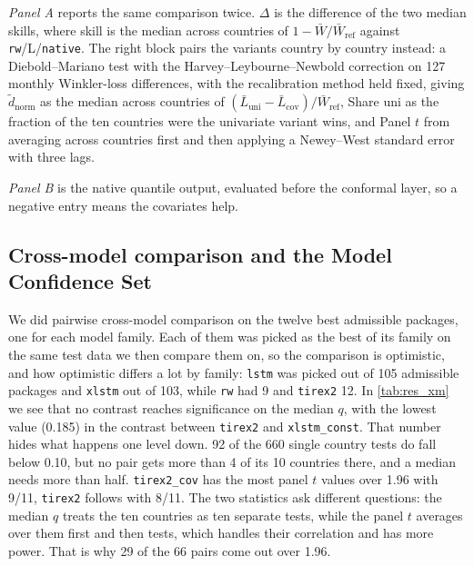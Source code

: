 \begin{table}[t]
{\begin{minipage}{0.98\textwidth}
\textit{Panel A} reports the same comparison twice. $\Delta$ is the difference of
the two median skills, where skill is the median across countries of
$1-\bar W/\bar W_{\mathrm{ref}}$ against \texttt{rw}/L/\texttt{native}. The right
block pairs the variants country by country instead: a Diebold--Mariano test with
the Harvey--Leybourne--Newbold correction on 127 monthly Winkler-loss differences,
with the recalibration method held fixed, giving $\tilde d_{\mathrm{norm}}$ as the
median across countries of
$(\bar L_{\mathrm{uni}}-\bar L_{\mathrm{cov}})/\bar W_{\mathrm{ref}}$, Share uni as
the fraction of the ten countries were the univariate variant wins, and Panel
$t$ from averaging across countries first and then applying a Newey--West standard
error with three lags.

\textit{Panel B} is the native quantile output, evaluated before the conformal layer, so a negative entry means the covariates help.
\end{minipage}}
\end{table}

\subsection{Cross-model comparison and the Model Confidence Set}
\label{sec:res:xm}
We did pairwise cross-model comparison on the twelve best admissible packages, one
for each model family. Each of them was picked as the best of its family on the same
test data we then compare them on, so the comparison is optimistic, and how
optimistic differs a lot by family: \texttt{lstm} was picked out of 105 admissible
packages and \texttt{xlstm} out of 103, while \texttt{rw} had 9 and \texttt{tirex2}
12. In \cref{tab:res_xm} we see that no contrast reaches significance on the median
$q$, with the lowest value (0.185) in the contrast between \texttt{tirex2} and
\texttt{xlstm\_const}. That number hides what happens one level down. 92 of the 660
single country tests do fall below 0.10, but no pair gets more than 4 of its 10
countries there, and a median needs more than half. \texttt{tirex2\_cov} has the most
panel $t$ values over 1.96 with 9/11, \texttt{tirex2} follows with 8/11. The two
statistics ask different questions: the median $q$ treats the ten countries as ten
separate tests, while the panel $t$ averages over them first and then tests, which
handles their correlation and has more power. That is why 29 of the 66 pairs come out
over 1.96.

